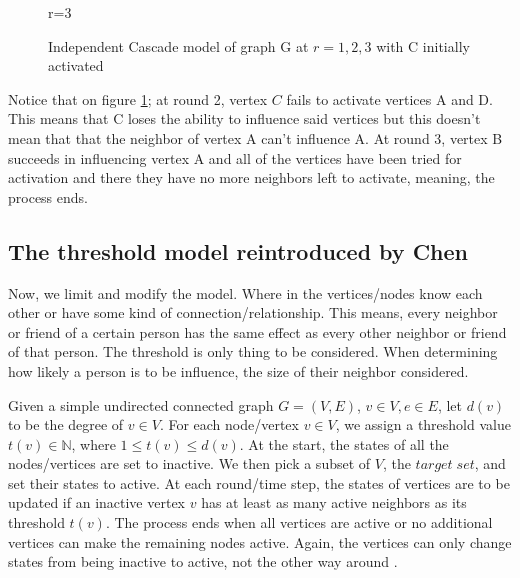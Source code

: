 \begin{figure}[h!]
\begin{minipage}{0.45\textwidth}
\caption{r=3}
	\end{minipage}
\caption{Independent Cascade model of graph G at $r=1,2,3$ with C initially activated}
\label{Independentfig1}
\end{figure}

Notice that on figure \ref{Independentfig1}; at round 2, vertex $C$ fails to activate vertices A and D. This means that C loses the ability to influence said vertices but this doesn't mean that that the neighbor of vertex A can't influence A. At round 3, vertex B succeeds in influencing vertex A and all of the vertices have been tried for activation and there they have no more neighbors left to activate, meaning, the process ends.
\subsection{The threshold model reintroduced by Chen}

Now, we limit and modify the model. Where in the vertices/nodes know each other or have some kind of connection/relationship. This means, every neighbor or friend of a certain person has the same effect as every other neighbor or friend of that person. The threshold is only thing to be considered. When determining how likely a person is to be influence, the size of their neighbor considered.

Given a simple undirected connected graph $G=(V,E)$, $v \in V, e \in E$, let $d(v)$ to be the degree of $v \in V$. For each node/vertex $v \in V$, we assign a threshold value $t(v) \in \mathbb{N}$, where $1 \leq t(v) \leq d(v)$. At the start, the states of all the nodes/vertices are set to inactive. We then pick a subset of $V$, the $target\; set$, and set their states to active. At each round/time step, the states of vertices are to be updated if an inactive vertex $v$ has at least as many active neighbors as its threshold $t(v)$. The process ends when all vertices are active or no additional vertices can make the remaining nodes active. Again, the vertices can only change states from being inactive to active, not the other way around \cite{chen}.

